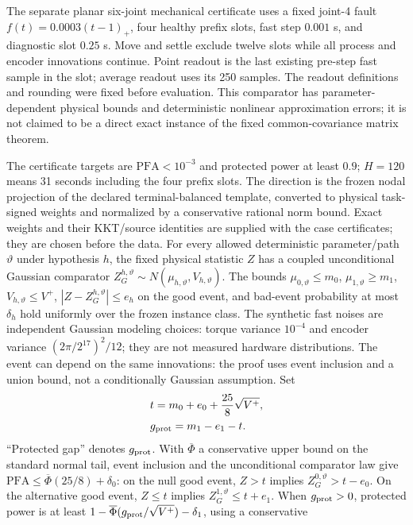 \documentclass[journal]{IEEEtran}
\begin{document}
The separate planar six-joint mechanical certificate uses a fixed joint-4
fault $f(t)=0.0003(t-1)_+$, four healthy prefix slots, fast step $0.001$ s,
and diagnostic slot $0.25$ s. Move and settle exclude twelve slots while
all process and encoder innovations continue. Point readout is the last
existing pre-step fast sample in the slot; average readout uses its 250 samples.
The readout definitions and rounding were fixed before evaluation.
This comparator has parameter-dependent physical bounds and deterministic
nonlinear approximation errors; it is not claimed to be a direct exact
instance of the fixed common-covariance matrix theorem.


The certificate targets are $\mathrm{PFA}<10^{-3}$ and protected power
at least $0.9$; $H=120$ means 31 seconds including the four prefix slots.
The direction is the frozen nodal projection of the declared terminal-balanced
template, converted to physical task-signed weights and normalized by a
conservative rational norm bound. Exact weights and their KKT/source identities
are supplied with the case certificates; they are chosen before the data.
For every allowed deterministic parameter/path $\vartheta$ under hypothesis $h$,
the fixed physical statistic $Z$ has a coupled unconditional Gaussian comparator
$Z_G^{h,\vartheta}\sim N(\mu_{h,\vartheta},V_{h,\vartheta})$.
The bounds $\mu_{0,\vartheta}\le m_0$, $\mu_{1,\vartheta}\ge m_1$,
$V_{h,\vartheta}\le V^+$, $|Z-Z_G^{h,\vartheta}|\le e_h$ on the good event,
and bad-event probability at most $\delta_h$ hold uniformly over the frozen
instance class. The synthetic fast noises are independent Gaussian modeling
choices: torque variance $10^{-4}$ and encoder variance
$(2\pi/2^{17})^2/12$; they are not measured hardware distributions.
The event can depend on the same innovations: the proof uses event
inclusion and a union bound, not a conditionally Gaussian assumption.
Set
\[
\begin{aligned}
&t=m_0+e_0+\frac{25}{8}\sqrt{V^+},\\
&g_{\rm prot}=m_1-e_1-t.
\end{aligned}
\]
``Protected gap'' denotes $g_{\rm prot}$. With $\overline\Phi$ a conservative upper bound on the standard normal tail,
event inclusion and the unconditional comparator law give
$\mathrm{PFA}\le\overline\Phi(25/8)+\delta_0$: on the null good event,
$Z>t$ implies $Z_G^{0,\vartheta}>t-e_0$.
On the alternative good event, $Z\le t$ implies
$Z_G^{1,\vartheta}\le t+e_1$. When $g_{\rm prot}>0$, protected power is at least
$1-\overline\Phi(g_{\rm prot}/\sqrt{V^+})-\delta_1$, using a conservative
\end{document}
